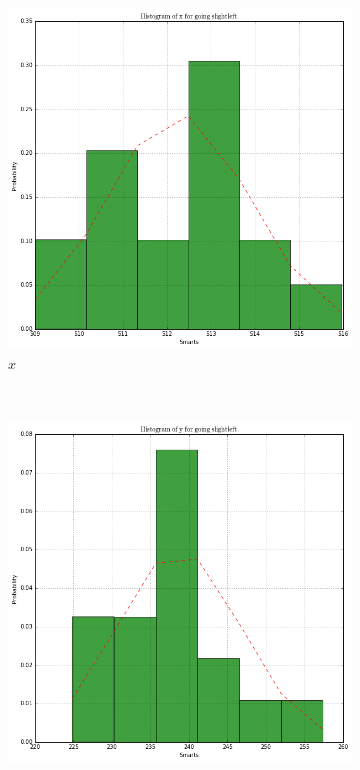 \documentclass[paper=a4, fontsize=11pt]{scrartcl} %
\begin{document}
    \begin{figure}[h!]
        \centering
        \begin{subfigure}[b]{0.3\textwidth}
            \setlength{\fboxsep}{0.5pt} %
            \setlength{\fboxrule}{0.5pt}
            \includegraphics[width=\textwidth,fbox]{images/histogram_2_x_slightLeft.png}
            \caption{$x$}
        \end{subfigure}
        ~
        \begin{subfigure}[b]{0.3\textwidth}
            \setlength{\fboxsep}{0.5pt} %
            \setlength{\fboxrule}{0.5pt}
            \includegraphics[width=\textwidth,fbox]{images/histogram_2_y_slightLeft.png}

\end{subfigure}
\end{figure}
\end{document}
